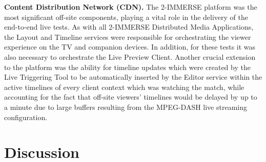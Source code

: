 \documentclass[sigchi-a, authorversion]{acmart}
\begin{document}
\vspace{5pt}\noindent\textbf{Content Distribution Network (CDN).} The 2-IMMERSE platform \cite{kegel2017} was the most significant
off-site components, playing a vital role in the delivery of the end-to-end live
tests. As with all 2-IMMERSE Distributed Media Applications, the Layout and
Timeline services were responsible for orchestrating the viewer experience on
the TV and companion devices. In addition, for these tests it was also necessary
to orchestrate the Live Preview Client. Another crucial extension to the platform
was the ability for timeline updates which were created by the Live Triggering
Tool to be automatically inserted by the Editor service within the active
timelines of every client context which was watching the match, while accounting
for the fact that off-site viewers' timelines would be delayed by up to a minute
due to large buffers resulting from the MPEG-DASH live streaming configuration.


\section{Discussion}
\end{document}

